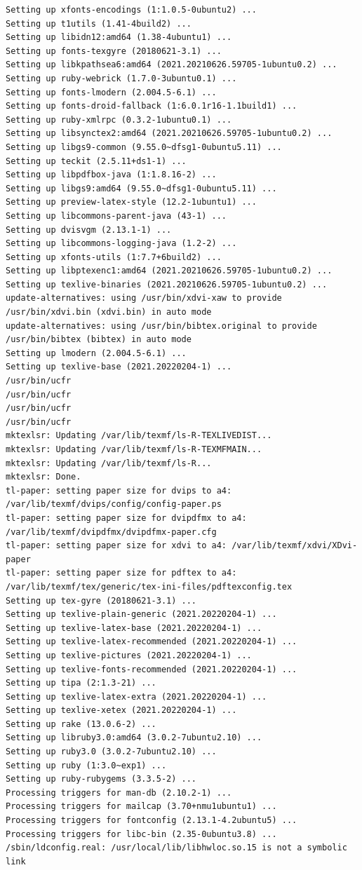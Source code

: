 \documentclass[
  11pt,
  letterpaper,
]{book}
\begin{document}
\begin{verbatim}
Setting up xfonts-encodings (1:1.0.5-0ubuntu2) ...
Setting up t1utils (1.41-4build2) ...
Setting up libidn12:amd64 (1.38-4ubuntu1) ...
Setting up fonts-texgyre (20180621-3.1) ...
Setting up libkpathsea6:amd64 (2021.20210626.59705-1ubuntu0.2) ...
Setting up ruby-webrick (1.7.0-3ubuntu0.1) ...
Setting up fonts-lmodern (2.004.5-6.1) ...
Setting up fonts-droid-fallback (1:6.0.1r16-1.1build1) ...
Setting up ruby-xmlrpc (0.3.2-1ubuntu0.1) ...
Setting up libsynctex2:amd64 (2021.20210626.59705-1ubuntu0.2) ...
Setting up libgs9-common (9.55.0~dfsg1-0ubuntu5.11) ...
Setting up teckit (2.5.11+ds1-1) ...
Setting up libpdfbox-java (1:1.8.16-2) ...
Setting up libgs9:amd64 (9.55.0~dfsg1-0ubuntu5.11) ...
Setting up preview-latex-style (12.2-1ubuntu1) ...
Setting up libcommons-parent-java (43-1) ...
Setting up dvisvgm (2.13.1-1) ...
Setting up libcommons-logging-java (1.2-2) ...
Setting up xfonts-utils (1:7.7+6build2) ...
Setting up libptexenc1:amd64 (2021.20210626.59705-1ubuntu0.2) ...
Setting up texlive-binaries (2021.20210626.59705-1ubuntu0.2) ...
update-alternatives: using /usr/bin/xdvi-xaw to provide /usr/bin/xdvi.bin (xdvi.bin) in auto mode
update-alternatives: using /usr/bin/bibtex.original to provide /usr/bin/bibtex (bibtex) in auto mode
Setting up lmodern (2.004.5-6.1) ...
Setting up texlive-base (2021.20220204-1) ...
/usr/bin/ucfr
/usr/bin/ucfr
/usr/bin/ucfr
/usr/bin/ucfr
mktexlsr: Updating /var/lib/texmf/ls-R-TEXLIVEDIST... 
mktexlsr: Updating /var/lib/texmf/ls-R-TEXMFMAIN... 
mktexlsr: Updating /var/lib/texmf/ls-R... 
mktexlsr: Done.
tl-paper: setting paper size for dvips to a4: /var/lib/texmf/dvips/config/config-paper.ps
tl-paper: setting paper size for dvipdfmx to a4: /var/lib/texmf/dvipdfmx/dvipdfmx-paper.cfg
tl-paper: setting paper size for xdvi to a4: /var/lib/texmf/xdvi/XDvi-paper
tl-paper: setting paper size for pdftex to a4: /var/lib/texmf/tex/generic/tex-ini-files/pdftexconfig.tex
Setting up tex-gyre (20180621-3.1) ...
Setting up texlive-plain-generic (2021.20220204-1) ...
Setting up texlive-latex-base (2021.20220204-1) ...
Setting up texlive-latex-recommended (2021.20220204-1) ...
Setting up texlive-pictures (2021.20220204-1) ...
Setting up texlive-fonts-recommended (2021.20220204-1) ...
Setting up tipa (2:1.3-21) ...
Setting up texlive-latex-extra (2021.20220204-1) ...
Setting up texlive-xetex (2021.20220204-1) ...
Setting up rake (13.0.6-2) ...
Setting up libruby3.0:amd64 (3.0.2-7ubuntu2.10) ...
Setting up ruby3.0 (3.0.2-7ubuntu2.10) ...
Setting up ruby (1:3.0~exp1) ...
Setting up ruby-rubygems (3.3.5-2) ...
Processing triggers for man-db (2.10.2-1) ...
Processing triggers for mailcap (3.70+nmu1ubuntu1) ...
Processing triggers for fontconfig (2.13.1-4.2ubuntu5) ...
Processing triggers for libc-bin (2.35-0ubuntu3.8) ...
/sbin/ldconfig.real: /usr/local/lib/libhwloc.so.15 is not a symbolic link


\end{verbatim}
\end{document}
